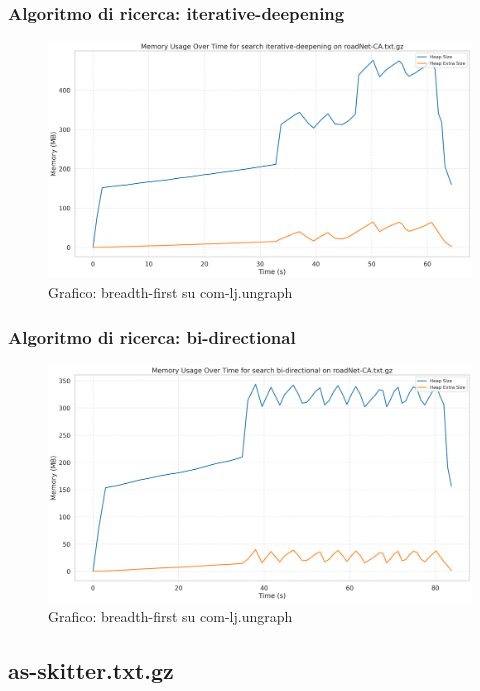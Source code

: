 \documentclass{article}
\begin{document}
\subsubsection{Algoritmo di ricerca: iterative-deepening}
\begin{figure}[htbp]\centering
\includegraphics[width=\textwidth]{../plots/roadNet-CA_iterative-deepening.png}
\caption{Grafico: breadth-first su com-lj.ungraph}
\end{figure}
\subsubsection{Algoritmo di ricerca: bi-directional}
\begin{figure}[htbp]\centering
\includegraphics[width=\textwidth]{../plots/roadNet-CA_bi-directional.png}
\caption{Grafico: breadth-first su com-lj.ungraph}
\end{figure}
\subsection{as-skitter.txt.gz}
\end{document}
